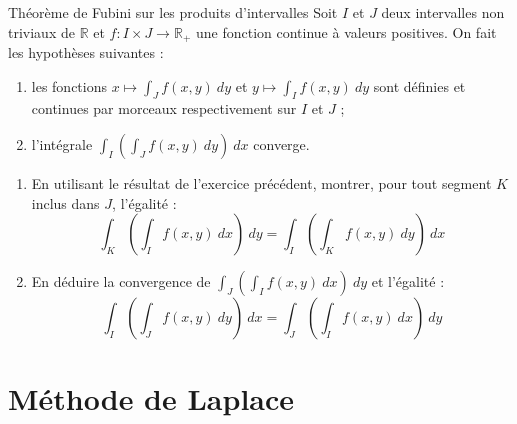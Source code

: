 \documentclass[french,a4paper]{article}
\newcommand{\R}{\mathbb{R}}
\theoremstyle{plain}
\theoremstyle{definition}
\theoremstyle{remark}
\begin{document}
\begin{ex}[Moulin.IP.34]{Théorème de Fubini sur les produits d'intervalles}
	Soit $I$ et $J$ deux intervalles non triviaux de $\R$ et $f:I\times J\to\R_+$ une fonction continue à valeurs positives. On fait les hypothèses suivantes : 
	\begin{enumerate}[label=(\roman*)]
		\item les fonctions $x\mapsto\displaystyle\int_J f(x,y)\ dy$ et $y\mapsto\displaystyle\int_I f(x,y)\ dy$ sont définies et continues par morceaux respectivement sur $I$ et $J$ ;
		\item l'intégrale $\displaystyle\int_I\left(\int_J f(x,y)\ dy\right)\ dx$ converge.
	\end{enumerate}
	\begin{enumerate}
		\item En utilisant le résultat de l'exercice précédent, montrer, pour tout segment $K$ inclus dans $J$, l'égalité : $$\int_K\left(\int_I f(x,y)\ dx\right)\ dy=\int_I\left(\int_K f(x,y)\ dy\right)\ dx$$
		\item En déduire la convergence de $\displaystyle\int_J\left(\int_I f(x,y)\ dx\right)\ dy$ et l'égalité : $$\int_I\left(\int_J f(x,y)\ dy\right)\ dx=\int_J\left(\int_I f(x,y)\ dx\right)\ dy$$
	\end{enumerate}
\end{ex}

\section{Méthode de Laplace}
\end{document}
